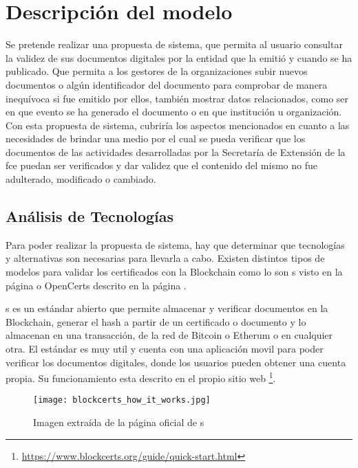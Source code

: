 \section{Descripción del modelo}

Se pretende realizar una propuesta de sistema, que permita al usuario consultar la validez  de sus documentos digitales   por la entidad que la emitió
  y cuando se ha publicado.
Que permita a los gestores de la organizaciones subir  nuevos documentos o algún identificador del documento para comprobar
de manera inequívoca si fue emitido por ellos, también mostrar datos relacionados, como ser en que evento se ha generado 
el documento o en que institución u organización.
Con esta propuesta de sistema, cubriría los aspectos mencionados en cuanto a las necesidades de brindar una medio por el cual
se pueda verificar que los documentos de las actividades desarrolladas por la  
  Secretaría de Extensión de la \gls{fce} puedan ser verificados y dar validez que el contenido del mismo no fue adulterado, modificado o cambiado.


\subsection{ Análisis de Tecnologías}
Para poder realizar la propuesta de sistema, hay que determinar que tecnologías y alternativas son necesarias para llevarla a cabo.
Existen distintos tipos de modelos para validar los certificados con la  Blockchain como lo son  s visto en la  página \pageref{sssec:blockcerts} o OpenCerts 
descrito en la  página \pageref{sssec:opencerts}.

s es un estándar abierto  que permite  almacenar y verificar documentos en la Blockchain,
generar el hash a partir de un certificado o documento y lo almacenan en una transacción, de la red de Bitcoin o Etherum o en cualquier otra.
El estándar es muy util y cuenta con una aplicación movil para poder verificar los documentos digitales, 
donde los usuarios pueden obtener una cuenta propia. Su funcionamiento esta descrito en el propio sitio web \footnote{\url{https://www.blockcerts.org/guide/quick-start.html}}.

\begin{figure}[hbt!]
  \centering
  {\texttt{[image: blockcerts\_how\_it\_works.jpg]}}
  \caption{Imagen extraída de la página oficial de s}
  \label{img:blockcerts_how_it_works}
\end{figure}



